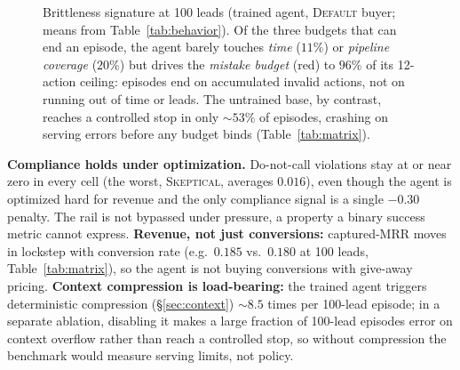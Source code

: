 \documentclass{article} %
\begin{document}
\begin{figure}[t]
\centering
{}
\caption{Brittleness signature at 100 leads (trained agent, \textsc{Default} buyer; means from Table~\ref{tab:behavior}).
Of the three budgets that can end an episode, the agent barely touches \emph{time} ($11\%$) or \emph{pipeline coverage}
($20\%$) but drives the \emph{mistake budget} (red) to $96\%$ of its 12-action ceiling: episodes end on accumulated
invalid actions, not on running out of time or leads. The untrained base, by contrast, reaches a controlled stop in only
${\sim}53\%$ of episodes, crashing on serving errors before any budget binds (Table~\ref{tab:matrix}).}
\label{fig:brittle}
\end{figure}

\textbf{Compliance holds under optimization.} Do-not-call violations stay at or near zero in every cell (the worst,
\textsc{Skeptical}, averages $0.016$), even though the agent is optimized hard for revenue and the only compliance
signal is a single $-0.30$ penalty. The rail is not bypassed under pressure, a property a binary success metric
cannot express. \textbf{Revenue, not just conversions:} captured-MRR moves in lockstep with conversion rate (e.g.\
$0.185$ vs.\ $0.180$ at 100 leads, Table~\ref{tab:matrix}), so the agent is not buying conversions with give-away
pricing. \textbf{Context compression is load-bearing:} the trained agent triggers deterministic compression
(\S\ref{sec:context}) ${\sim}8.5$ times per 100-lead episode; in a separate ablation, disabling it makes a large
fraction of 100-lead episodes error on context overflow rather than reach a controlled stop, so without compression
the benchmark would measure serving limits, not policy.
\end{document}
